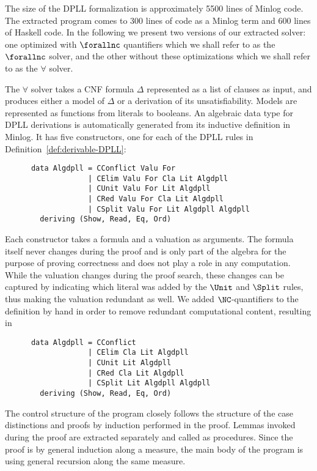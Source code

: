 \label{sec:program}
The size of the DPLL formalization 
is approximately 5500  lines of Minlog code. The extracted program comes to 300 lines of code as a Minlog term and  600 lines of Haskell code. In the following we present two versions of our extracted solver: one optimized with $\forallnc$ quantifiers which we shall refer to as the $\forallnc$ solver, and the other without these optimizations which we shall refer to as the $\forall$ solver.
  
The $\forall$ solver takes a CNF formula $\Delta$ represented as a list of
clauses as input, and produces either a model of $\Delta$ or a
derivation of its unsatisfiability.
Models are represented as functions from literals to booleans. An
algebraic data type for DPLL derivations is automatically generated
from its inductive definition in Minlog. It has five constructors, one
for each of the DPLL rules in Definition~\ref{def:derivable-DPLL}:
\begin{verbatim}
      data Algdpll = CConflict Valu For
                   | CElim Valu For Cla Lit Algdpll
                   | CUnit Valu For Lit Algdpll
                   | CRed Valu For Cla Lit Algdpll
                   | CSplit Valu For Lit Algdpll Algdpll
        deriving (Show, Read, Eq, Ord)
\end{verbatim}
Each constructor takes a formula and a valuation as arguments. The
formula itself never changes during the proof and is only part of the algebra for the purpose of proving correctness and does not play a role in any computation. While the valuation changes
during the proof search, these changes can be captured by indicating
which literal was added by the $\Unit$ and $\Split$ rules, thus making
the valuation redundant as well.  We added $\NC$-quantifiers to the
definition by hand in order to remove redundant
computational content, resulting in
\begin{verbatim}
      data Algdpll = CConflict
                   | CElim Cla Lit Algdpll
                   | CUnit Lit Algdpll
                   | CRed Cla Lit Algdpll
                   | CSplit Lit Algdpll Algdpll
        deriving (Show, Read, Eq, Ord)
\end{verbatim}


The control structure of the program closely follows the structure
of the case distinctions and proofs by induction performed in the
proof. Lemmas invoked during the proof are extracted separately and
called as procedures. Since the proof is by general induction along a
measure, the main body of the program is using general recursion along
the same measure.
























